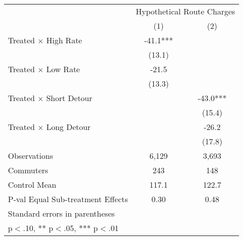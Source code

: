 {
\def\sym#1{\ifmmode^{#1}\else\(^{#1}\)\fi}
\begin{tabular}{l*{2}{c}}
\toprule
            &\multicolumn{2}{c}{Hypothetical Route Charges}\\\cmidrule(lr){2-3}
            &\multicolumn{1}{c}{(1)}   &\multicolumn{1}{c}{(2)}   \\
\addlinespace\addlinespace
Treated $\times$ High Rate&       -41.1***&               \\
            &      (13.1)   &               \\
\addlinespace
Treated $\times$ Low Rate&       -21.5   &               \\
            &      (13.3)   &               \\
\addlinespace
Treated $\times$ Short Detour&               &       -43.0***\\
            &               &      (15.4)   \\
\addlinespace
Treated $\times$ Long Detour&               &       -26.2   \\
            &               &      (17.8)   \\
\addlinespace\addlinespace
Observations&       6,129   &       3,693   \\
Commuters   &         243   &         148   \\
Control Mean&       117.1   &       122.7   \\
P-val Equal Sub-treatment Effects&        0.30   &        0.48   \\
\bottomrule
\multicolumn{3}{l}{\footnotesize Standard errors in parentheses}\\
\multicolumn{3}{l}{\footnotesize * p$<$.10, ** p$<$.05, *** p$<$.01}\\
\end{tabular}
}
